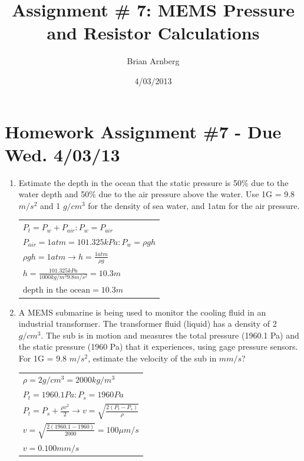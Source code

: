\documentclass{article}
\title{Assignment \# 7: MEMS Pressure and Resistor Calculations}
\date{4/03/2013}
\author{Brian Arnberg}
\begin{document}
\label{start}



\section*{ Homework Assignment \#7 - Due Wed. 4/03/13 }
\renewcommand{\labelenumi}{\arabic{enumi})}
\begin{multicols}{2}
\begin{enumerate}
\item\label{p1}
 Estimate the depth in the ocean that the static pressure is 50\% due to the water
     depth and 50\% due to the air pressure above the water. Use 1G = 9.8 $m/s^2$ and 1
     $g/cm^3$ for the density of sea water, and 1atm for the air pressure.

		\begin{tabular}{ l }
			$P_t = P_w + P_{air} \colon P_w = P_{air}$\\
			$P_{air} = 1atm = 101.325kPa \colon P_w = \rho g h$\\
			$\rho g h = 1atm \rightarrow h = \frac{1atm}{\rho g}$\\
			$h = \frac{101.325kPa}{1000 kg/m^3 9.8m/s^2} = 10.3m$\\
			$\text{depth in the ocean} = 10.3 m$
		\end{tabular}
\item\label{p2}
A MEMS submarine is being used to monitor the cooling fluid in an industrial
     transformer. The transformer fluid (liquid) has a density of 2 $g/cm^3$. The sub is in
     motion and measures the total pressure (1960.1 Pa) and the static pressure (1960
     Pa) that it experiences, using gage pressure sensors. For 1G = 9.8 $m/s^2$, estimate
     the velocity of the sub in $mm/s$?

		\begin{tabular}{ l }
			$ \rho = 2 g/cm^3 = 2000kg/m^3$\\
			$P_t = 1960.1 Pa \colon P_s = 1960 Pa$\\
			$P_t = P_s + \frac{\rho v^2}{2} \rightarrow v=\sqrt{\frac{2(P_t - P_s)}{\rho}}$\\
			$v = \sqrt{\frac{2(1960.1 - 1960)}{2000}} = 100\mu m/s$\\
			$v = 0.100 mm/s$
		\end{tabular}
  

\end{enumerate}
\end{multicols}
\end{document}
